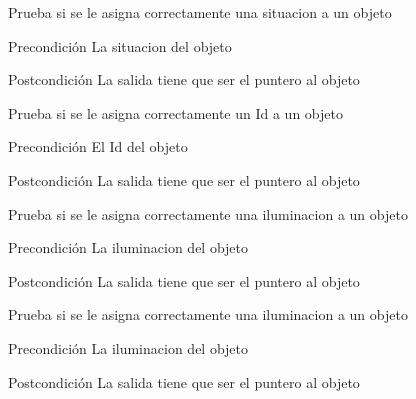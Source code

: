 \begin{DoxyRefList}
\item[\label{test__test000173}%
\hypertarget{test__test000173}{}%
Global \hyperlink{object__test_8c_ad34813fd6f6eff843819ab3b2d2381e5}{test1\-\_\-object\-\_\-set\-\_\-\-Hidden} ()]Prueba si se le asigna correctamente una situacion a un objeto \begin{DoxyPrecond}{Precondición}
La situacion del objeto 
\end{DoxyPrecond}
\begin{DoxyPostcond}{Postcondición}
La salida tiene que ser el puntero al objeto  
\end{DoxyPostcond}

\item[\label{test__test000163}%
\hypertarget{test__test000163}{}%
Global \hyperlink{object__test_8c_a55a8860afca36ca65eea851bf01020d3}{test1\-\_\-object\-\_\-set\-\_\-\-Id} ()]Prueba si se le asigna correctamente un Id a un objeto \begin{DoxyPrecond}{Precondición}
El Id del objeto 
\end{DoxyPrecond}
\begin{DoxyPostcond}{Postcondición}
La salida tiene que ser el puntero al objeto  
\end{DoxyPostcond}

\item[\label{test__test000177}%
\hypertarget{test__test000177}{}%
Global \hyperlink{object__test_8c_a85014cd5037fa334371eb85dcae7efa3}{test1\-\_\-object\-\_\-set\-\_\-\-Illuminates} ()]Prueba si se le asigna correctamente una iluminacion a un objeto \begin{DoxyPrecond}{Precondición}
La iluminacion del objeto 
\end{DoxyPrecond}
\begin{DoxyPostcond}{Postcondición}
La salida tiene que ser el puntero al objeto  
\end{DoxyPostcond}

\item[\label{test__test000179}%
\hypertarget{test__test000179}{}%
Global \hyperlink{object__test_8c_ac81bad1897f9afe5ca335c30568be601}{test1\-\_\-object\-\_\-set\-\_\-\-Light} ()]Prueba si se le asigna correctamente una iluminacion a un objeto \begin{DoxyPrecond}{Precondición}
La iluminacion del objeto 
\end{DoxyPrecond}
\begin{DoxyPostcond}{Postcondición}
La salida tiene que ser el puntero al objeto  
\end{DoxyPostcond}


\end{DoxyRefList}
